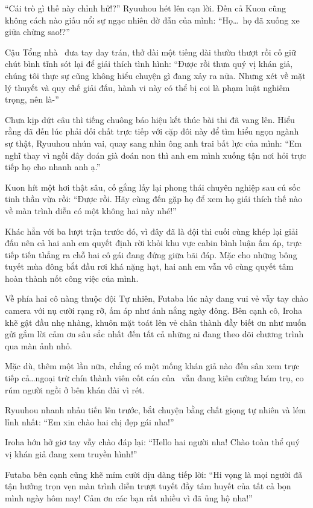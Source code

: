 \documentclass[../main.tex]{subfiles}
\begin{document}
``Cái trò gì thế này chỉnh hử!?'' Ryuuhou hét lên cạn lời. Đến cả Kuon cũng không cách nào giấu nổi sự ngạc nhiên đờ đẫn của mình: ``Họ\dots\ họ đã xuống xe giữa chừng sao!?''

Cậu Tổng nhà \hll\ đưa tay day trán, thở dài một tiếng dài thườn thượt rồi cố giữ chút bình tĩnh sót lại để giải thích tình hình: ``Được rồi thưa quý vị khán giả, chúng tôi thực sự cũng không hiểu chuyện gì đang xảy ra nữa. Nhưng xét về mặt lý thuyết và quy chế giải đấu, hành vi này có thể bị coi là phạm luật nghiêm trọng, nên là-''

Chưa kịp dứt câu thì tiếng chuông báo hiệu kết thúc bài thi đã vang lên. Hiểu rằng đã đến lúc phải đối chất trực tiếp với cặp đôi này để tìm hiểu ngọn ngành sự thật, Ryuuhou nhún vai, quay sang nhìn ông anh trai bất lực của mình: ``Em nghĩ thay vì ngồi đây đoán già đoán non thì anh em mình xuống tận nơi hỏi trực tiếp họ cho nhanh anh ạ.''

Kuon hít một hơi thật sâu, cố gắng lấy lại phong thái chuyên nghiệp sau cú sốc tinh thần vừa rồi: ``Được rồi. Hãy cùng đến gặp họ để xem họ giải thích thế nào về màn trình diễn có một không hai này nhé!''

Khác hẳn với ba lượt trận trước đó, vì đây đã là đội thi cuối cùng khép lại giải đấu nên cả hai anh em quyết định rời khỏi khu vực cabin bình luận ấm áp, trực tiếp tiến thẳng ra chỗ hai cô gái đang đứng giữa bãi đáp. Mặc cho những bông tuyết mùa đông bắt đầu rơi khá nặng hạt, hai anh em vẫn vô cùng quyết tâm hoàn thành nốt công việc của mình.

Về phía hai cô nàng thuộc đội Tự nhiên, Futaba lúc này đang vui vẻ vẫy tay chào camera với nụ cười rạng rỡ, ấm áp như ánh nắng ngày đông. Bên cạnh cô, Iroha khẽ gật đầu nhẹ nhàng, khuôn mặt toát lên vẻ chân thành đầy biết ơn như muốn gửi gắm lời cảm ơn sâu sắc nhất đến tất cả những ai đang theo dõi chương trình qua màn ảnh nhỏ.

Mặc dù, thêm một lần nữa, chẳng có một mống khán giả nào đến sân xem trực tiếp cả\dots ngoại trừ chín thành viên cốt cán của \hll\ vẫn đang kiên cường bám trụ, co rúm người ngồi ở bên khán đài vì rét.

Ryuuhou nhanh nhảu tiến lên trước, bắt chuyện bằng chất giọng tự nhiên và lém lỉnh nhất: ``Em xin chào hai chị đẹp gái nha!''

Iroha hớn hở giơ tay vẫy chào đáp lại: ``Hello hai người nha! Chào toàn thể quý vị khán giả đang xem truyền hình!''

Futaba bên cạnh cũng khẽ mỉm cười dịu dàng tiếp lời: ``Hi vọng là mọi người đã tận hưởng trọn vẹn màn trình diễn trượt tuyết đầy tâm huyết của tất cả bọn mình ngày hôm nay! Cảm ơn các bạn rất nhiều vì đã ủng hộ nha!''
\end{document}
